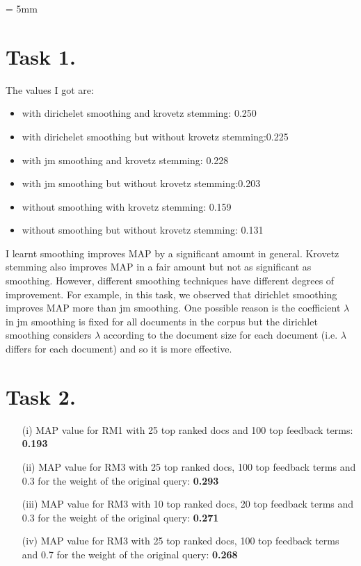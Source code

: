 \documentclass[11pt]{article}
\begin{document}



\baselineskip = 5mm

%

\section*{Task 1.}%

The values I got are: 

\begin{itemize}
\item with dirichelet smoothing and krovetz stemming: 0.250
\item with dirichelet smoothing but without krovetz stemming:0.225
\item with jm smoothing and krovetz stemming: 0.228
\item with jm smoothing but without krovetz stemming:0.203
\item without smoothing with krovetz stemming: 0.159
\item without smoothing but without krovetz stemming: 0.131 
\end{itemize}

I learnt smoothing improves MAP by a significant amount in general. Krovetz stemming also improves MAP in a fair amount but not as significant as smoothing. However, different smoothing techniques have different degrees of improvement. For example, in this task, we observed that dirichlet smoothing improves MAP more than jm smoothing. One possible reason is the coefficient $\lambda$ in jm smoothing is fixed for all documents in the corpus but the dirichlet smoothing considers $\lambda$ according to the document size for each document (i.e. $\lambda$ differs for each document) and so it is more effective. 

\section*{Task 2.}
 
\begin{itemize}
\item[(i)] MAP value for RM1 with 25 top ranked docs and 100 top feedback terms: {\bf 0.193}

\item[(ii)] MAP value for RM3 with 25 top ranked docs, 100 top feedback terms and 0.3 for the weight of the original query: {\bf 0.293}

\item[(iii)] MAP value for RM3 with 10 top ranked docs, 20 top feedback terms and 0.3 for the weight of the original query: {\bf 0.271}

\item[(iv)] MAP value for RM3 with 25 top ranked docs, 100 top feedback terms and 0.7 for the weight of the original query: {\bf 0.268}
\end{itemize}
\end{document}
